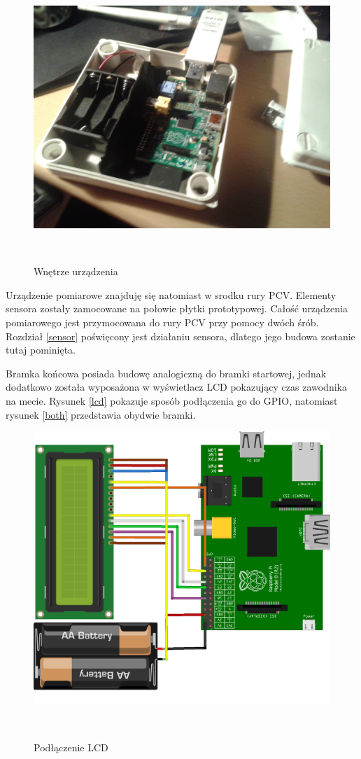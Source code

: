 \documentclass[11pt,a4paper, twoside]{article}
\begin{document}
\begin{figure}[H]
\begin{center}
\includegraphics[scale=0.08]{./img/insides1.jpg}
\caption{Wnętrze urządzenia}
$\label{skrzynka-in}$
\end{center}
\end{figure}
Urządzenie pomiarowe znajduję się natomiast w srodku rury PCV. Elementy sensora zostały zamocowane na połowie płytki prototypowej. Całość urządzenia pomiarowego jest przymocowana do rury PCV przy pomocy dwóch śrób. Rozdział \ref{sensor} poświęcony jest działaniu sensora, dlatego jego budowa zostanie tutaj pominięta.

Bramka końcowa posiada budowę analogiczną do bramki startowej, jednak dodatkowo została wyposażona w wyświetlacz LCD pokazujący czas zawodnika na mecie. Rysunek \ref{lcd} pokazuje sposób podłączenia go do GPIO, natomiast rysunek \ref{both} przedstawia obydwie bramki. 
\begin{figure}[H]
\begin{center}
\includegraphics[scale=0.125]{./img/lcd_bb.png}
\caption{Podłączenie LCD}
$\label{lcd}$
\end{center}
\end{figure}
\end{document}
